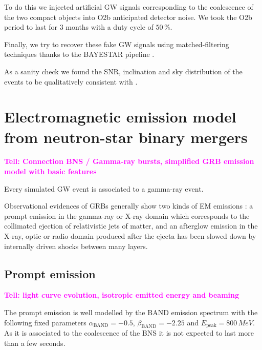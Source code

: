 \documentclass[a0,portrait]{a0poster}
\newcommand{\ECM}[1] {\textbf{\textcolor{magenta}{#1}}}
\begin{document}
\begin{multicols}{2}
To do this we injected artificial GW signals corresponding to the coalescence of
the two compact objects into O2b anticipated detector noise.  We took the O2b
period to last for 3 months with a duty cycle of $50 \, \%$.

Finally, we try to recover these fake GW signals using matched-filtering
techniques thanks to the BAYESTAR pipeline \cite{PhysRevD.93.024013}.

As a sanity check we found the SNR, inclination and sky distribution of the
events to be qualitatively consistent with \cite{2016arXiv160606124P}.


\section*{Electromagnetic emission model from neutron-star binary mergers}

\ECM{Tell: Connection BNS / Gamma-ray bursts, simplified GRB emission model with basic features}

Every simulated GW event is associated to a gamma-ray event.

Observational evidences of GRBs generally show two kinds of EM emissions : a
prompt emission in the gamma-ray or X-ray domain which corresponds to the
collimated ejection of relativistic jets of matter, and an afterglow emission in
the X-ray, optic or radio domain produced after the ejecta has been slowed down
by internally driven shocks between many layers.

\subsection*{Prompt emission}

\ECM{Tell: light curve evolution, isotropic emitted energy and beaming}

The prompt emission is well modelled by the BAND emission spectrum with the
following fixed parameters $\alpha_{\mathrm{BAND}} = - 0.5$,
$\beta_{\mathrm{BAND}} = - 2.25$ and $E_{\mathrm{peak}} = 800 \, MeV$. As it is
associated to the coalescence of the BNS it is not expected to last more than a
few seconds. 


\end{multicols}
\end{document}
